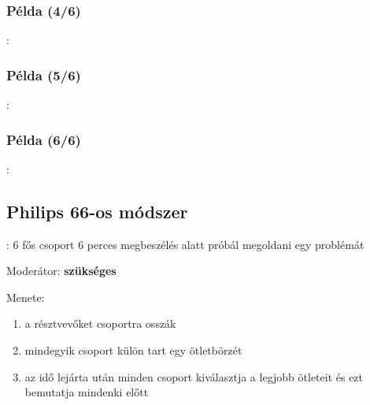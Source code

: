 \documentclass{beamer}
\begin{document}
\subsubsection*{Példa (4/6)}
\begin{frame}{\subsecname : \subsubsecname}
    
\end{frame}

\subsubsection*{Példa (5/6)}
\begin{frame}{\subsecname : \subsubsecname}
    
\end{frame}

\subsubsection*{Példa (6/6)}
\begin{frame}{\subsecname : \subsubsecname}
    
\end{frame}

\subsection{Philips 66-os módszer}
\begin{frame}{\secname : \subsecname}
6 fős csoport 6 perces megbeszélés alatt próbál megoldani egy problémát

Moderátor: \textbf{szükséges}

Menete:
\begin{enumerate}
    \item a résztvevőket csoportra osszák
    \item mindegyik csoport külön tart egy ötletbörzét
    \item az idő lejárta után minden csoport kiválasztja a legjobb ötleteit és ezt bemutatja mindenki előtt
\end{enumerate}
\end{frame}
\end{document}
